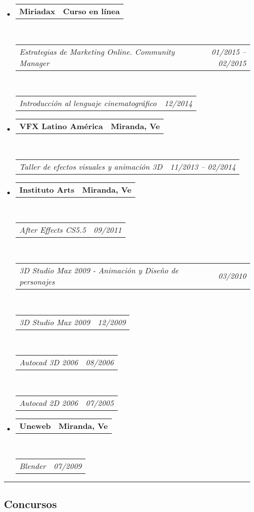 \documentclass[10pt,letterpaper]{article}
\makeatletter
\newcommand{\headerrow}[2]
{\begin{tabular*}{\linewidth}{l@{\extracolsep{\fill}}r}
	#1 &
	#2 \\
\end{tabular*}}
\makeatother
\begin{document}
\begin{itemize}
	\parskip=0.1em

\item 
   \headerrow
   {\textbf{Miriadax}}
   {\textbf{Curso en línea}}
  \\
  \headerrow
   {\emph{Estrategias de Marketing Online. Community Manager}}
   {\emph{01/2015 -- 02/2015}}
  \\
  \headerrow
   {\emph{Introducción al lenguaje cinematográfico}}
   {\emph{12/2014}}
\item 
   \headerrow
   {\textbf{VFX Latino América}}
   {\textbf{Miranda, Ve}}
  \\
  \headerrow
   {\emph{Taller de efectos visuales y animación 3D}}
   {\emph{11/2013 -- 02/2014}}

\item 
   \headerrow
   {\textbf{Instituto Arts}}
   {\textbf{Miranda, Ve}}
	\\
	\headerrow
   {\emph{After Effects CS5.5}}
   {\emph{09/2011}}
	\\
	\headerrow
   {\emph{3D Studio Max 2009 - Animación y Diseño de personajes}}
   {\emph{03/2010}}
	\\
	\headerrow
   {\emph{3D Studio Max 2009}}
   {\emph{12/2009}}
	\\
	\headerrow
   {\emph{Autocad 3D 2006}}
   {\emph{08/2006}}
	\\
	\headerrow
   {\emph{Autocad 2D 2006}}
   {\emph{07/2005}}

\item 
   \headerrow
   {\textbf{Uneweb}}
   {\textbf{Miranda, Ve}}
	\\
	\headerrow
   {\emph{Blender}}
   {\emph{07/2009}}
\end{itemize}



\hrule
\vspace{-0.4em}
\subsection*{Concursos}
\end{document}
